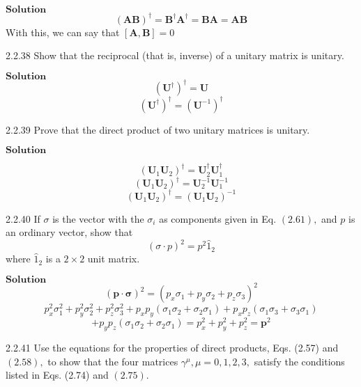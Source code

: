\documentclass{article}
\begin{document}
\begin{flushleft}
$\boxed{\textbf{Solution}}$ 
$$(\mathbf{A}\mathbf{B})^{\dagger}=\mathbf{B}^{\dagger} \mathbf{A}^{\dagger}=\mathbf{B} \mathbf{A}=\mathbf{AB}$$
With this, we can say that $[\mathbf{A}, \mathbf{B}] = 0$

\newpage

\begin{mybox}{2.2.38}
Show that the reciprocal (that is, inverse) of a unitary matrix is unitary.
\end{mybox}


$\boxed{\textbf{Solution}}$ 
$$\left( \mathbf{U}^{\dagger}\right)^{\dagger}=\mathbf{U}$$
$$\left( \mathbf{U}^{\dagger}\right)^{\dagger}=\left( \mathbf{U}^{-1}\right)^{\dagger}$$

\newpage

\begin{mybox}{2.2.39}
Prove that the direct product of two unitary matrices is unitary.
\end{mybox}

$\boxed{\textbf{Solution}}$ 

$$\left( \mathbf{U}_{1}  \mathbf{U}_{2}\right)^{\dagger}= \mathbf{U}_{2}^{\dagger}  \mathbf{U}_{1}^{\dagger}$$
$$\left( \mathbf{U}_{1}  \mathbf{U}_{2}\right)^{\dagger}= \mathbf{U}_{2}^{-1}  \mathbf{U}_{1}^{-1}$$
$$\left( \mathbf{U}_{1}  \mathbf{U}_{2}\right)^{\dagger}=\left( \mathbf{U}_{1}  \mathbf{U}_{2}\right)^{-1}$$

\newpage

\begin{mybox}{2.2.40}
If $\sigma$ is the vector with the $\sigma_{i}$ as components given in Eq. $(2.61),$ and $p$ is an ordinary vector, show that
$$(\sigma \cdot p)^{2}=p^{2} \hat{1}_{2}$$
where $\hat{1}_{2}$ is a $2 \times 2$ unit matrix.
\end{mybox}


$\boxed{\textbf{Solution}}$ 
$$(\mathbf{p} \cdot \boldsymbol{\sigma})^{2}=\left(p_{x} \sigma_{1}+p_{y} \sigma_{2}+p_{z} \sigma_{3}\right)^{2}$$
$$p_{x}^{2} \sigma_{1}^{2}+p_{y}^{2} \sigma_{2}^{2}+p_{z}^{2} \sigma_{3}^{2}+p_{x} p_{y}\left(\sigma_{1} \sigma_{2}+\sigma_{2} \sigma_{1}\right)+p_{x} p_{z}\left(\sigma_{1} \sigma_{3}+\sigma_{3} \sigma_{1}\right)$$
$$+p_{y} p_{z}\left(\sigma_{1} \sigma_{2}+\sigma_{2} \sigma_{1}\right)=p_{x}^{2}+p_{y}^{2}+p_{z}^{2}=\mathbf{p}^{2}$$

\newpage

\begin{mybox}{2.2.41}
Use the equations for the properties of direct products, Eqs. (2.57) and $(2.58),$ to show
that the four matrices $\gamma^{\mu}, \mu=0,1,2,3,$ satisfy the conditions listed in Eqs. (2.74) and $(2.75) .$
\end{mybox}



\end{flushleft}
\end{document}
